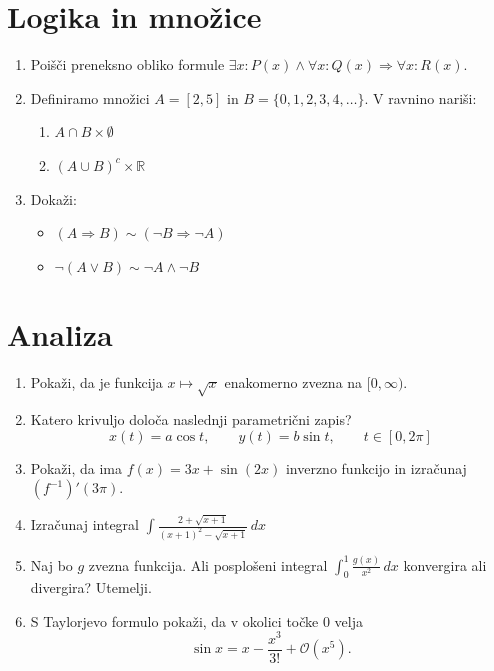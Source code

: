 \documentclass[a4paper,12pt]{article}
\begin{document}
\section*{Logika in množice}

\begin{enumerate}
\item
Poišči preneksno obliko formule \(\exists x : P(x) \land \forall x : Q(x) \Rightarrow \forall x : R(x)\).

\item
Definiramo množici \(A = [2, 5]\) in \(B = \{0, 1, 2, 3, 4, \ldots\}\).
V ravnino nariši:
\begin{enumerate}
\item \(A \cap B \times \emptyset\)
\item \((A \cup B)^c \times \mathbb{R}\)
\end{enumerate}

\item
Dokaži:
\begin{itemize}
\item \((A \Rightarrow B) \sim (\neg B \Rightarrow \neg A)\)
\item \(\neg (A \lor B) \sim \neg A \land \neg B\)
\end{itemize}
\end{enumerate}

\section*{Analiza}

\begin{enumerate}
\item
Pokaži, da je funkcija \(x \mapsto \sqrt{x}\) enakomerno zvezna na \([0, \infty)\).

\item
Katero krivuljo določa naslednji parametrični zapis?
\[
x(t) = a \cos t, \qquad
y(t) = b \sin t, \qquad
t \in [0, 2 \pi]
\]

\item
Pokaži, da ima \(f(x) = 3x + \sin(2x)\) inverzno funkcijo in izračunaj \((f^{-1})'(3\pi)\).

\item
Izračunaj integral
\(\displaystyle \int \frac{2 + \sqrt{x+1}}{(x+1)^2 - \sqrt{x+1}} \, dx\)

\item
Naj bo \(g\) zvezna funkcija. Ali posplošeni integral
\(\int_0^1 \frac{g(x)}{x^2} \, dx\)
konvergira ali divergira? Utemelji.

\item
S Taylorjevo formulo pokaži, da v okolici točke \(0\) velja
\[
  \sin x = x - \frac{x^3}{3!} + \mathcal{O}(x^5).
\]
\end{enumerate}
\end{document}
